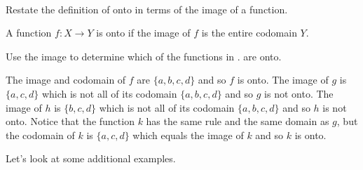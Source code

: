 \begin{exam}
\label{exam_onto_image}
~
    \begin{apart}
        \item Restate the definition of onto in terms of the image of a function.
            \begin{soln}
                A function $f:X \to Y$ is onto if the image of $f$ is the entire codomain $Y$.
            \end{soln}
        \item Use the image to determine which of the functions in . are onto.
            \begin{soln}
                 The image and codomain of $f$ are $\{a,b,c,d\}$ and so $f$ is onto.  The image of $g$ is $\{a,c,d\}$ which is not all of its codomain $\{a,b,c,d\}$ and so $g$ is not onto. The image of $h$ is $\{b,c,d\}$ which is not all of its codomain $\{a,b,c,d\}$ and so $h$ is not onto.  Notice that the function $k$ has the same rule and the same domain as $g$, but the codomain of $k$ is $\{a,c,d\}$ which equals the image of $k$ and so $k$ is onto.
            \end{soln}
    \end{apart}
\end{exam}

Let's look at some additional examples.

